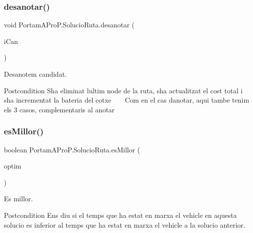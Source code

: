 \subsubsection{\texorpdfstring{desanotar()}{desanotar()}}
{\footnotesize\ttfamily void Portam\+A\+Pro\+P.\+Solucio\+Ruta.\+desanotar (\begin{DoxyParamCaption}\item[{\hyperlink{class_portam_a_pro_p_1_1_candidat_ruta}{Candidat\+Ruta}}]{i\+Can }\end{DoxyParamCaption})}



Desanotem candidat. 

\begin{DoxyPostcond}{Postcondition}
S\textquotesingle{}ha eliminat l\textquotesingle{}ultim node de la ruta, s\textquotesingle{}ha actualitzat el cost total i s\textquotesingle{}ha incrementat la bateria del cotxe ~\newline
~\newline
Com en el cas d\textquotesingle{}anotar, aqui tambe tenim els 3 casos, complementaris al anotar ~\newline

\end{DoxyPostcond}
\mbox{\label{class_portam_a_pro_p_1_1_solucio_ruta_aefcddb3e0a49950f99007c52d5845cdc}} 
\subsubsection{\texorpdfstring{es\+Millor()}{esMillor()}}
{\footnotesize\ttfamily boolean Portam\+A\+Pro\+P.\+Solucio\+Ruta.\+es\+Millor (\begin{DoxyParamCaption}\item[{\hyperlink{class_portam_a_pro_p_1_1_solucio_ruta}{Solucio\+Ruta}}]{optim }\end{DoxyParamCaption})}



Es millor. 

\begin{DoxyPostcond}{Postcondition}
Ens diu si el temps que ha estat en marxa el vehicle en aquesta solucio es inferior al temps que ha estat en marxa el vehicle a la solucio anterior. 
\end{DoxyPostcond}
\mbox{\label{class_portam_a_pro_p_1_1_solucio_ruta_aaf3d50166e85a38269d39b9f7bde1a83}} 
